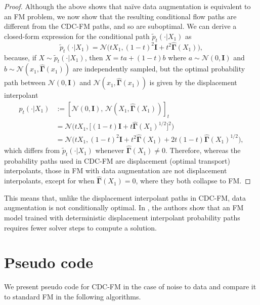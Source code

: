 \documentclass{article} %
\newcommand{\N}{\mathcal{N}}
\newcommand{\I}{\mathbf{I}}
\newcommand{\G}{\widehat{\mathbf{\Gamma}}}
\begin{document}
\begin{proof}
Although the above shows that naïve data augmentation is equivalent to an FM problem, we now show that the resulting conditional flow paths are different from the CDC-FM paths, and so are suboptimal.
We can derive a closed-form expression for the conditional path 
$\tilde{p}_t( \cdot | X_1)$ as
\begin{equation}
\tilde{p}_t( \cdot | X_1)
= \N\big(t X_1, (1-t)^2 \textbf{I} + t^2 \G(X_1) \big),
\end{equation}
because, if $X \sim \tilde{p}_t( \cdot | X_1)$, then $X = ta + (1-t)b$ where $a \sim \N(0, \I)$ and $b \sim \N(x_1, \G(x_1))$ are independently sampled, but the optimal probability path between $\N(0, \I)$ and $\N(x_1, \G(x_1))$ is given by the displacement interpolant
\begin{align*}
p_t(\cdot | X_1)
&:= [\N(0, \I),\, \N(X_1, \G(X_1))]_t \\
&= \N\big(t X_1, \big[(1-t)\I + t\G (X_1)^{1/2}\big]^2 \big) \\
&= \N\big(t X_1, (1-t)^2\I + t^2\G (X_1) + 2t(1-t)\G (X_1)^{1/2} \big),
\end{align*}
%
which differs from $\tilde{p}_t( \cdot | X_1)$ whenever $\G (X_1) \neq 0$.
Therefore, whereas the probability paths used in CDC-FM are displacement (optimal transport) interpolants, those in FM with data augmentation are not displacement interpolants, except for when $\G (X_1) = 0$, where they both collapse to FM.
\end{proof}

This means that, unlike the displacement interpolant paths in CDC-FM, data augmentation is not conditionally optimal.
In \cite{lipman2023flow}, the authors show that an FM model trained with deterministic displacement interpolant probability paths requires fewer solver steps to compute a solution.

\section{Pseudo code}\label{app:pseudocode}

We present pseudo code for CDC-FM in the case of noise to data and compare it to standard FM in the following algorithms.
\end{document}
